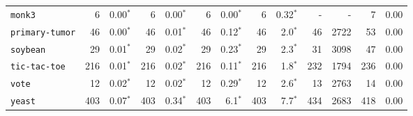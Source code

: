 \begin{tabular}{lrrrrrrrrrrrr}
\texttt{monk3} & 6 & 0.00$^*$ & 6 & 0.00$^*$ & 6 & 0.00$^*$ & 6 & 0.32$^*$ & - & - & 7 & 0.00\\
\texttt{primary-tumor} & 46 & 0.00$^*$ & 46 & 0.01$^*$ & 46 & 0.12$^*$ & 46 & 2.0$^*$ & 46 & 2722 & 53 & 0.00\\
\texttt{soybean} & 29 & 0.01$^*$ & 29 & 0.02$^*$ & 29 & 0.23$^*$ & 29 & 2.3$^*$ & 31 & 3098 & 47 & 0.00\\
\texttt{tic-tac-toe} & 216 & 0.01$^*$ & 216 & 0.02$^*$ & 216 & 0.11$^*$ & 216 & 1.8$^*$ & 232 & 1794 & 236 & 0.00\\
\texttt{vote} & 12 & 0.02$^*$ & 12 & 0.02$^*$ & 12 & 0.29$^*$ & 12 & 2.6$^*$ & 13 & 2763 & 14 & 0.00\\
\texttt{yeast} & 403 & 0.07$^*$ & 403 & 0.34$^*$ & 403 & 6.1$^*$ & 403 & 7.7$^*$ & 434 & 2683 & 418 & 0.00\\
\bottomrule
\end{tabular}
